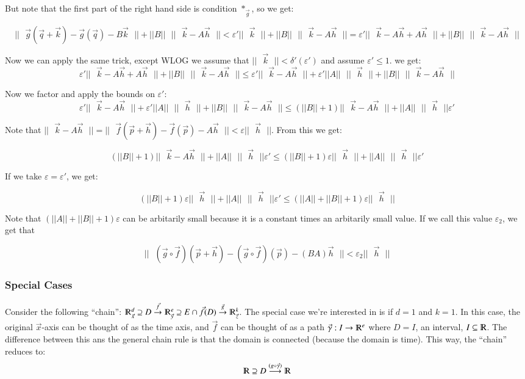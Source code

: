 \documentclass [12 pt, twoside] {book}
\newcommand\+{\text{ }}
\begin{document}
But note that the first part of the right hand side is condition $*_{\vec{g}}$,
so we get:

\[
||\+\vec{g}(\vec{q} + \vec{k}) - \vec{g}(\vec{q}) - B\vec{k}\+|| + ||B||\+
||\+\vec{k} - A\vec{h}\+|| < \varepsilon' ||\+\vec{k}\+|| + ||B||\+||\+\vec{k} -
A\vec{h}\+|| = \varepsilon' ||\+\vec{k} - A\vec{h} + A\vec{h}\+|| + ||B||\+
||\+\vec{k} - A\vec{h}\+||
\]

Now we can apply the same trick, except WLOG we assume that $||\+\vec{k}\+|| <
\delta'(\varepsilon')$ and assume $\varepsilon' \leq 1$.  we get:
\[
    \varepsilon' ||\+\vec{k} - A\vec{h} + A\vec{h}\+|| + ||B||\+
    ||\+\vec{k} - A\vec{h}\+|| \leq \varepsilon' ||\+\vec{k} - A\vec{h}\+|| +
    \varepsilon'||A||\+||\+\vec{h}\+|| + ||B||\+||\+\vec{k} - A\vec{h}\+||
\]

Now we factor and apply the bounds on $\varepsilon'$:
\[
    \varepsilon' ||\+\vec{k} - A\vec{h}\+|| +
    \varepsilon'||A||\+||\+\vec{h}\+|| + ||B||\+||\+\vec{k} - A\vec{h}\+|| \leq
    (||B|| + 1) ||\+\vec{k} - A\vec{h}\+|| + ||A||\+||\+\vec{h}\+||\varepsilon'
\]

Note that $||\+\vec{k} - A\vec{h}\+|| = ||\+\vec{f}(\vec{p} + \vec{h}) -
\vec{f}(\vec{p}) - A\vec{h}\+|| < \varepsilon ||\+\vec{h}\+||$. From this we
get:

\[
    (||B|| + 1) ||\+\vec{k} - A\vec{h}\+|| + ||A||\+||\+\vec{h}\+||\varepsilon'
    \leq (||B|| + 1) \varepsilon ||\+\vec{h}\+|| + ||A|| \+ ||\+\vec{h}\+||
    \varepsilon'
\]

If we take $\varepsilon = \varepsilon'$, we get:

\[
    (||B|| + 1) \varepsilon ||\+\vec{h}\+|| + ||A|| \+ ||\+\vec{h}\+||
    \varepsilon' \leq (||A|| + ||B|| + 1) \varepsilon ||\+\vec{h}\+||
\]

Note that $(||A|| + ||B|| + 1) \varepsilon$ can be arbitarily small because it
is a constant times an arbitarily small value. If we call this value
$\varepsilon_2$, we get that

\[
    ||\+(\vec{g} \circ \vec{f})(\vec{p} + \vec{h}) - (\vec{g} \circ
    \vec{f})(\vec{p}) - (BA) \vec{h}\+||
    < \varepsilon_2 ||\+\vec{h}\+||
\]

\subsubsection{Special Cases}

Consider the following ``chain'': $\varmathbb{R}^d_{\vec{x}} \supseteq D
\overset{\vec{f}}{\to} \varmathbb{R}^e_{\vec{y}} \supseteq E \cap \vec{f}(D)
\overset{\vec{g}}{\to} \varmathbb{R}^k_{\vec{z}}$. The special case we're
interested in is if $d = 1$ and $k = 1$. In this case, the original $\vec{x}$-axis can be
thought of as the time axis, and $\vec{f}$ can be thought of as a path
$\vec{\gamma}: I \to \varmathbb{R}^e$ where $D = I$, an interval, $I \subseteq
\varmathbb{R}$. The difference between this ans the general chain rule is that
the domain is connected (because the domain is time). This way, the ``chain''
reduces to: 
$$\varmathbb{R} \supseteq D \overset{(g \circ
\vec{\gamma})}{\longrightarrow} \varmathbb{R}$$
\end{document}
